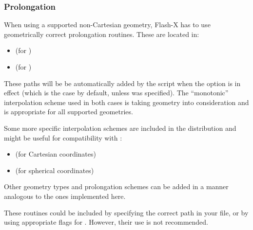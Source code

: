 \subsubsection{Prolongation}
When using a supported non-Cartesian geometry, Flash-X has to use
geometrically correct prolongation routines. These
are located in:
\begin{itemize}
\item { (for
)}
\item {
(for )}

\end{itemize}
These paths will be be automatically added by the  script when the
 option is in effect
(which is the case by default, unless  was specified).
The ``monotonic'' interpolation%
scheme
used in both cases is taking geometry
into consideration and is appropriate for all supported geometries.

\begin{flashtip}
Some more specific  interpolation schemes are included in the distribution
and might be useful for compatibility with \flashx:
\begin{itemize}
\item {
(for Cartesian coordinates)}
\item {
(for spherical coordinates)}
\end{itemize}
Other geometry types and prolongation schemes can
be added in a manner analogous to the ones implemented here.

These routines could be included by specifying the correct path in your
 file, or by using appropriate  flags
for .
However, their use is not recommended.
\end{flashtip}


